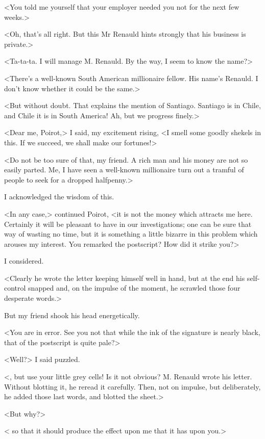 <You told me yourself that your employer needed you not for the next few weeks.> 

 <Oh, that's all right. But this Mr Renauld hints strongly that his business is private.> 

 <Ta-ta-ta. I will manage M. Renauld. By the way, I seem to know the name?> 

 <There's a well-known South American millionaire fellow. His name's Renauld. I don't know whether it could be the same.> 

 <But without doubt. That explains the mention of Santiago. Santiago is in Chile, and Chile it is in South America! Ah, but we progress finely.> 

 <Dear me, Poirot,> I said, my excitement rising, <I smell some goodly shekels in this. If we succeed, we shall make our fortunes!> 

 <Do not be too sure of that, my friend. A rich man and his money are not so easily parted. Me, I have seen a well-known millionaire turn out a tramful of people to seek for a dropped halfpenny.> 

 I acknowledged the wisdom of this. 

 <In any case,> continued Poirot, <it is not the money which attracts me here. Certainly it will be pleasant to have  in our investigations; one can be sure that way of wasting no time, but it is something a little bizarre in this problem which arouses my interest. You remarked the postscript? How did it strike you?> 

 I considered. 

 <Clearly he wrote the letter keeping himself well in hand, but at the end his self-control snapped and, on the impulse of the moment, he scrawled those four desperate words.> 

 But my friend shook his head energetically. 

 <You are in error. See you not that while the ink of the signature is nearly black, that of the postscript is quite pale?> 

 <Well?> I said puzzled. 

 <, but use your little grey cells! Is it not obvious? M. Renauld wrote his letter. Without blotting it, he reread it carefully. Then, not on impulse, but deliberately, he added those last words, and blotted the sheet.> 

 <But why?> 

 < so that it should produce the effect upon me that it has upon you.> 

